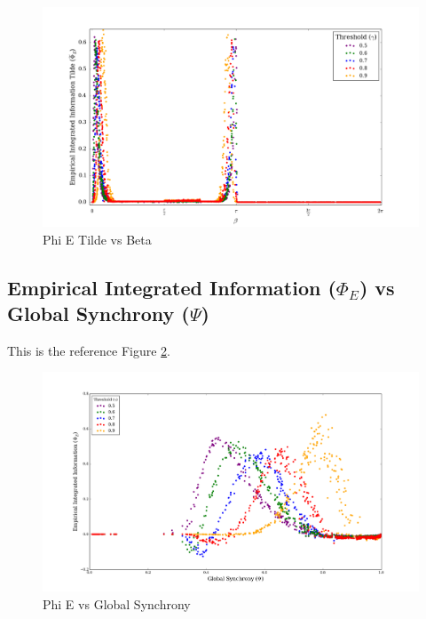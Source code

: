 \documentclass[a4paper,11pt]{article}
\begin{document}
\begin{figure}[H]
\begin{center}
\includegraphics[scale = 0.35]{figures/phi_tilde_vs_beta_ext_multi}
\caption{
	Phi E Tilde vs Beta
	\label{fig:phi-tilde-vs-beta-ext-multi}
}
\end{center}
\end{figure}


\subsection{Empirical Integrated Information ($\Phi_{E}$) vs Global Synchrony ($\Psi$)}

This is the reference Figure \ref{fig:phi-vs-psi-multi}.

\begin{figure}[H]
\begin{center}
\includegraphics[scale = 0.35]{figures/phi_vs_psi_multi}
\caption{
	Phi E vs Global Synchrony
	\label{fig:phi-vs-psi-multi}
}
\end{center}
\end{figure}
\end{document}
